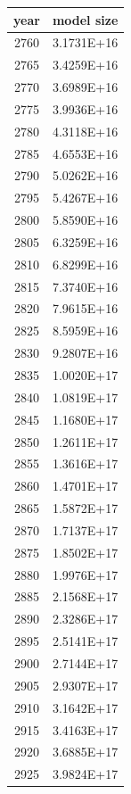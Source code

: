\documentclass[a4paper]{article}
\begin{document}
    \begin{tabular}{| c | c |}
    	\hline
    	year & model size \\\hline
    	2760 & 3.1731E+16 \\\hline
    	2765 & 3.4259E+16 \\\hline
    	2770 & 3.6989E+16 \\\hline
    	2775 & 3.9936E+16 \\\hline
    	2780 & 4.3118E+16 \\\hline
    	2785 & 4.6553E+16 \\\hline
    	2790 & 5.0262E+16 \\\hline
    	2795 & 5.4267E+16 \\\hline
    	2800 & 5.8590E+16 \\\hline
    	2805 & 6.3259E+16 \\\hline
    	2810 & 6.8299E+16 \\\hline
    	2815 & 7.3740E+16 \\\hline
    	2820 & 7.9615E+16 \\\hline
    	2825 & 8.5959E+16 \\\hline
    	2830 & 9.2807E+16 \\\hline
    	2835 & 1.0020E+17 \\\hline
    	2840 & 1.0819E+17 \\\hline
    	2845 & 1.1680E+17 \\\hline
    	2850 & 1.2611E+17 \\\hline
    	2855 & 1.3616E+17 \\\hline
    	2860 & 1.4701E+17 \\\hline
    	2865 & 1.5872E+17 \\\hline
    	2870 & 1.7137E+17 \\\hline
    	2875 & 1.8502E+17 \\\hline
    	2880 & 1.9976E+17 \\\hline
    	2885 & 2.1568E+17 \\\hline
    	2890 & 2.3286E+17 \\\hline
    	2895 & 2.5141E+17 \\\hline
    	2900 & 2.7144E+17 \\\hline
    	2905 & 2.9307E+17 \\\hline
    	2910 & 3.1642E+17 \\\hline
    	2915 & 3.4163E+17 \\\hline
    	2920 & 3.6885E+17 \\\hline
    	2925 & 3.9824E+17 \\\hline

\end{tabular}
\end{document}
